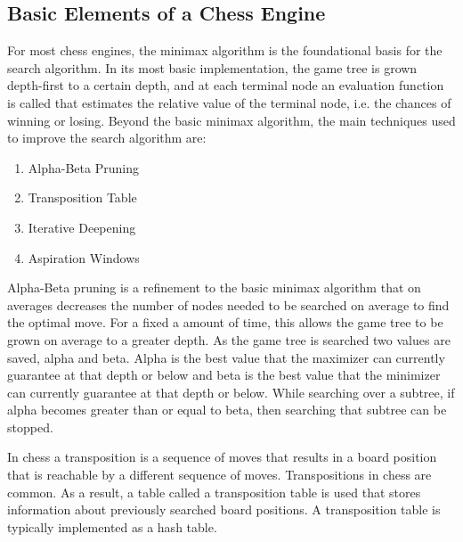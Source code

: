 \documentclass[12pt]{article}
\begin{document}
\subsection{Basic Elements of a Chess Engine}
For most chess engines, the minimax algorithm is the foundational basis for the search algorithm. In its most basic implementation, the game tree is grown depth-first to a certain depth, and at each terminal node an evaluation function is called that estimates the relative value of the terminal node, i.e. the chances of winning or losing. Beyond the basic minimax algorithm, the main techniques used to improve the search algorithm are:
\begin{enumerate}
	\item Alpha-Beta Pruning
	\item Transposition Table
	\item Iterative Deepening
	\item Aspiration Windows
\end{enumerate}

Alpha-Beta pruning is a refinement to the basic minimax algorithm that on averages decreases the number of nodes needed to be searched on average to find the optimal move. For a fixed a amount of time, this allows the game tree to be grown on average to a greater depth. As the game tree is searched two values are saved, alpha and beta. Alpha is the best value that the maximizer can currently guarantee at that depth or below and beta is the best value that the minimizer can currently guarantee at that depth or below. While searching over a subtree, if alpha becomes greater than or equal to beta, then searching that subtree can be stopped.

In chess a transposition is a sequence of moves that results in a board position that is reachable by a different sequence of moves. Transpositions in chess are common. As a result, a table called a transposition table is used that stores information about previously searched board positions. A transposition table is typically implemented as a hash table.
\end{document}
